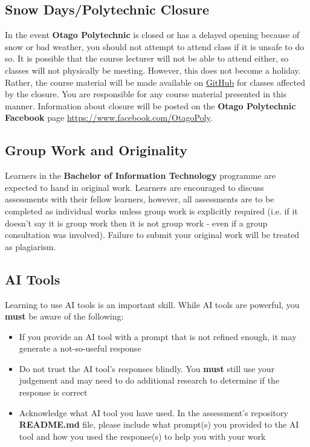 \documentclass{article}
\begin{document}
\subsection*{Snow Days/Polytechnic Closure}
In the event \textbf{Otago Polytechnic} is closed or has a delayed opening because of snow or bad weather, you should not attempt to attend class if it is unsafe to do so. It is possible that the course lecturer will not be able to attend either, so classes will not physically be meeting. However, this does not become a holiday. Rather, the course material will be made available on \href{https://github.com/otago-polytechnic-bit-courses/ID607001-intro-app-dev-concepts}{GitHub} for classes affected by the closure. You are responsible for any course material presented in this manner. Information about closure will be posted on the \textbf{Otago Polytechnic Facebook} page \href{https://www.facebook.com/OtagoPoly}{https://www.facebook.com/OtagoPoly}.

\subsection*{Group Work and Originality}
Learners in the \textbf{Bachelor of Information Technology} programme are expected to hand in original work. Learners are encouraged to discuss assessments with their fellow learners, however, all assessments are to be completed as individual works unless group work is explicitly required (i.e. if it doesn't say it is group work then it is not group work - even if a group consultation was involved). Failure to submit your original work will be treated as plagiarism.

\subsection*{AI Tools}
Learning to use AI tools is an important skill. While AI tools are powerful, you \textbf{must} be aware of the following:

\begin{itemize}
    \item If you provide an AI tool with a prompt that is not refined enough, it may generate a not-so-useful response
    \item Do not trust the AI tool's responses blindly. You \textbf{must} still use your judgement and may need to do additional research to determine if the response is correct
    \item Acknowledge what AI tool you have used. In the assessment's repository \textbf{README.md} file, please include what prompt(s) you provided to the AI tool and how you used the response(s) to help you with your work
\end{itemize}
\end{document}
